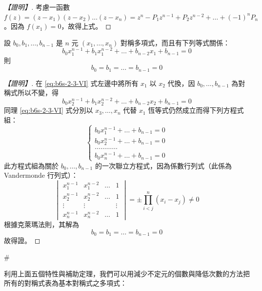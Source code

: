 \begin{proof}[【證明】]
考慮一函數 $f(z) = (z-x_1)(z-x_2)\dots(z-x_n) = z^n - P_1 z^{n-1} + P_2 z^{n-2} + \dots + (-1)^n P_n$。因為 $f(x_1)=0$，故得上式。
\end{proof}

\begin{lemma}\label{lem:b6s-2-sym-vandermonde}
設 $b_0, b_1, \dots, b_{n-1}$ 是 $n$ 元 $(x_1, \dots, x_n)$ 對稱多項式，而且有下列等式關係：
\begin{equation}
b_0 x_1^{n-1} + b_1 x_1^{n-2} + \dots + b_{n-2} x_1 + b_{n-1} = 0 \tag{VI} \label{eq:b6s-2-3-VI}
\end{equation}
則
\[ b_0 = b_1 = \dots = b_{n-1} = 0 \]
\end{lemma}

\begin{proof}[【證明】]
在 \eqref{eq:b6s-2-3-VI} 式左邊中將所有 $x_1$ 以 $x_2$ 代換，因 $b_0, \dots, b_{n-1}$ 為對稱式所以不變，得
\[ b_0 x_2^{n-1} + b_1 x_2^{n-2} + \dots + b_{n-2} x_2 + b_{n-1} = 0 \]
同理 \eqref{eq:b6s-2-3-VI} 式分別以 $x_3, \dots, x_n$ 代替 $x_1$ 恆等式仍然成立而得下列方程式組：
\[ \begin{cases}
b_0 x_1^{n-1} + \dots + b_{n-1} = 0 \\
b_0 x_2^{n-1} + \dots + b_{n-1} = 0 \\
\dots\dots\dots\dots \\
b_0 x_n^{n-1} + \dots + b_{n-1} = 0
\end{cases} \]
此方程式組為關於 $b_0, \dots, b_{n-1}$ 的一次聯立方程式，因為係數行列式（此係為 Vandermonde 行列式）：
\[ \begin{vmatrix}
x_1^{n-1} & x_1^{n-2} & \dots & 1 \\
x_2^{n-1} & x_2^{n-2} & \dots & 1 \\
\vdots & \vdots & & \vdots \\
x_n^{n-1} & x_n^{n-2} & \dots & 1
\end{vmatrix} = \pm \prod_{i<j}^n (x_i-x_j) \ne 0 \]
根據克萊瑪法則，其解為
\[ b_0 = b_1 = \dots = b_{n-1} = 0 \]
故得證。\end{proof}\hfill$\#$

利用上面五個特性與補助定理，我們可以用減少不定元的個數與降低次數的方法把所有的對稱式表為基本對稱式之多項式：

